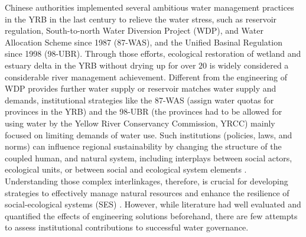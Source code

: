 Chinese authorities implemented several ambitious water management practices in the YRB in the last century to relieve the water stress, such as reservoir regulation, South-to-north Water Diversion Project (WDP), and Water Allocation Scheme since 1987 (87-WAS), and the Unified Basinal Regulation since 1998 (98-UBR).
Through those efforts, ecological restoration of wetland and estuary delta in the YRB without drying up for over $20$ is widely considered a considerable river management achievement.
Different from the engineering of WDP provides further water supply or reservoir matches water supply and demands, institutional strategies like the 87-WAS (assign water quotas for provinces in the YRB) and the 98-UBR (the provinces had to be allowed for using water by the Yellow River Conservancy Commission, YRCC) mainly focused on limiting demands of water use.
Such institutions (policies, laws, and norms) can influence regional sustainability by changing the structure of the coupled human, and natural system, including interplays between social actors, ecological units, or between social and ecological system elements \cite{young2008,cumming2020b,lien2020, bodin2017b}.
Understanding those complex interlinkages, therefore, is crucial for developing strategies to effectively manage natural resources and enhance the resilience of social-ecological systems (SES) \cite{kluger2020}.
However, while literature had well evaluated and quantified the effects of engineering solutions beforehand, there are few attempts to assess institutional contributions to successful water governance.


